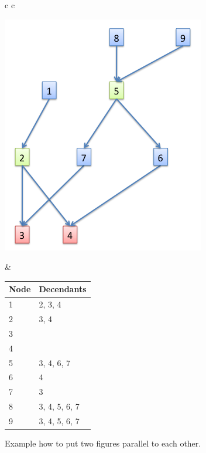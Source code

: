 \documentclass[12pt]{article}
\begin{document}
\begin{figure} [htbp]
\begin{tabular}{c c}
%
\begin{minipage}{0.45\textwidth}
\includegraphics[width=\textwidth]{LCA_2_solutions}
\end{minipage}
%
&
\begin{minipage}{0.55\textwidth}
\centering
\begin{tabular}{ l | l |}
	Node & Decendants \\ \hline
  1 & 2, 3, 4 \\ \hline
  2 & 3, 4 \\ \hline
  3 & \\ \hline
  4 & \\ \hline
  5 & 3, 4, 6, 7 \\ \hline
  6 & 4 \\ \hline
  7 & 3 \\  \hline
  8 & 3, 4, 5, 6, 7\\ \hline
  9 & 3, 4, 5, 6, 7\\ \hline
\end{tabular}
\end{minipage}
\end{tabular}
%
\caption{Example how to put two figures parallel to each other.}
\label{fig:LCA_2_solutions}
\end{figure}
\end{document}
